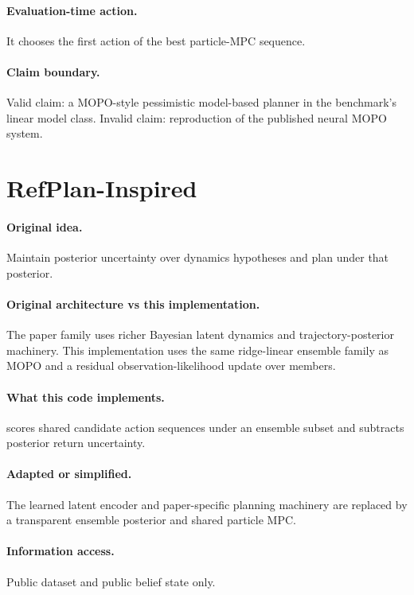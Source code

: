 \documentclass[11pt]{article}
\begin{document}
\paragraph{Evaluation-time action.}
It chooses the first action of the best particle-MPC sequence.

\paragraph{Claim boundary.}
Valid claim: a MOPO-style pessimistic model-based planner in the benchmark's
linear model class. Invalid claim: reproduction of the published neural MOPO
system.

\section{RefPlan-Inspired}

\paragraph{Original idea.}
Maintain posterior uncertainty over dynamics hypotheses and plan under that
posterior.

\paragraph{Original architecture vs this implementation.}
The paper family uses richer Bayesian latent dynamics and trajectory-posterior
machinery. This implementation uses the same ridge-linear ensemble family as
MOPO and a residual observation-likelihood update over members.

\paragraph{What this code implements.}
 scores shared candidate action sequences under an ensemble
subset and subtracts posterior return uncertainty.

\paragraph{Adapted or simplified.}
The learned latent encoder and paper-specific planning machinery are replaced by
a transparent ensemble posterior and shared particle MPC.

\paragraph{Information access.}
Public dataset and public belief state only.
\end{document}
